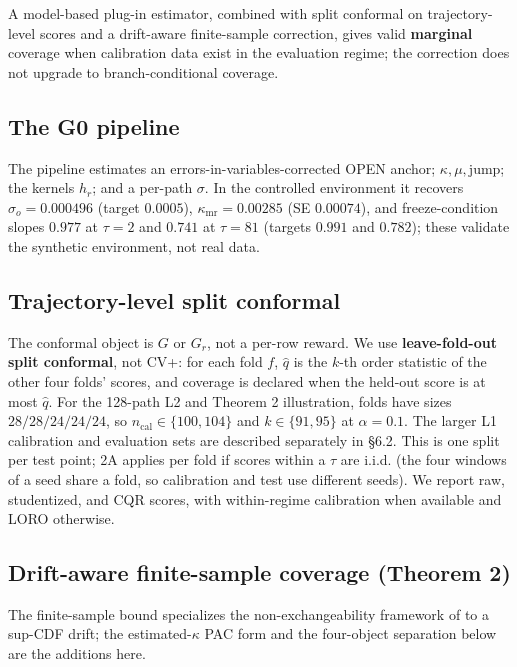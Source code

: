 A model-based plug-in estimator, combined with split conformal on trajectory-level scores and a drift-aware finite-sample correction, gives valid \textbf{marginal} coverage when calibration data exist in the evaluation regime; the correction does not upgrade to branch-conditional coverage.

\subsection{The G0 pipeline}

The pipeline estimates an errors-in-variables-corrected OPEN anchor; $\kappa,\mu,\text{jump}$; the kernels $h_r$; and a per-path $\sigma$. In the controlled environment it recovers $\sigma_o=0.000496$ (target $0.0005$), $\kappa_{\mathrm{mr}}=0.00285$ (SE $0.00074$), and freeze-condition slopes $0.977$ at $\tau=2$ and $0.741$ at $\tau=81$ (targets $0.991$ and $0.782$); these validate the synthetic environment, not real data.

\subsection{Trajectory-level split conformal}

The conformal object is $G$ or $G_r$, not a per-row reward. We use \textbf{leave-fold-out split conformal}, not CV+: for each fold $f$, $\hat q$ is the $k$-th order statistic of the other four folds' scores, and coverage is declared when the held-out score is at most $\hat q$. For the 128-path L2 and Theorem 2 illustration, folds have sizes $28/28/24/24/24$, so $n_{\mathrm{cal}}\in\{100,104\}$ and $k\in\{91,95\}$ at $\alpha=0.1$. The larger L1 calibration and evaluation sets are described separately in \S6.2. This is one split per test point; 2A applies per fold if scores within a $\tau$ are i.i.d. (the four windows of a seed share a fold, so calibration and test use different seeds). We report raw, studentized, and CQR scores, with within-regime calibration when available and LORO otherwise.

\subsection{Drift-aware finite-sample coverage (Theorem 2)}

The finite-sample bound specializes the non-exchangeability framework of \cite{barber2023} to a sup-CDF drift; the estimated-$\kappa$ PAC form and the four-object separation below are the additions here.

